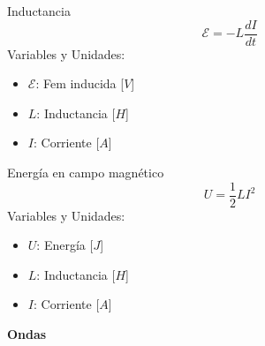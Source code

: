 \documentclass{article}
\begin{document}
\begin{multicols}{3}
\begin{teorema}{Inductancia}
    $$\mathcal{E} = -L \frac{dI}{dt}$$
    Variables y Unidades:
    \begin{itemize}
        \item $\mathcal{E}$: Fem inducida [$V$]
        \item $L$: Inductancia [$H$]
        \item $I$: Corriente [$A$]
    \end{itemize}
\end{teorema}

\begin{teorema}{Energía en campo magnético}
    $$U = \frac{1}{2} L I^2$$
    Variables y Unidades:
    \begin{itemize}
        \item $U$: Energía [$J$]
        \item $L$: Inductancia [$H$]
        \item $I$: Corriente [$A$]
    \end{itemize}
\end{teorema}

\end{multicols}

\newpage

\begin{center}
    \LARGE \textbf{Ondas}
\end{center}
\end{document}
